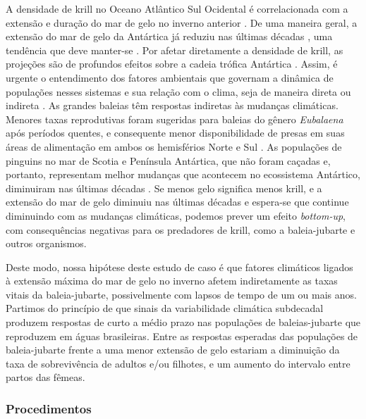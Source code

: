 \documentclass[12pt, A4]{article}
\begin{document}
A densidade de krill no Oceano Atlântico Sul Ocidental é
correlacionada com a extensão e duração do mar de gelo no inverno
anterior \citep{loeb1997,atkinson2004}. De uma maneira
geral, a extensão do mar de gelo da Antártica já reduziu nas últimas
décadas \citep{trivelpiece2011}, uma tendência que deve manter-se 
\citep{ipcc2007}. Por afetar diretamente a densidade de krill, as
projeções são de profundos efeitos sobre a cadeia trófica Antártica
\citep{nicol2008}. 
Assim, é urgente o entendimento dos fatores ambientais que governam a
dinâmica de populações nesses sistemas e sua relação com o clima, 
seja de maneira direta ou indireta
\citep{boggs2012}. 
As grandes baleias têm respostas indiretas às mudanças
climáticas. Menores taxas reprodutivas foram sugeridas para baleias do
gênero \emph{Eubalaena} após períodos quentes, e consequente
menor disponibilidade de presas em suas áreas de alimentação em ambos
os hemisférios Norte e Sul \citep{greene2004,leaper2006}. 
As populações de pinguins no mar de Scotia e Península
Antártica, que não foram caçadas e, portanto, representam melhor
mudanças que acontecem no ecossistema Antártico, diminuiram nas
últimas décadas \citep{trivelpiece2011}. Se menos gelo
significa menos krill, e a extensão do mar de gelo diminuiu nas
últimas décadas e espera-se que continue diminuindo com as mudanças
climáticas, podemos prever um efeito \emph{bottom-up}, com consequências
negativas para os predadores de krill, como a baleia-jubarte e outros
organismos.

Deste modo, nossa hipótese deste estudo de caso é que fatores
climáticos ligados à extensão máxima do mar de gelo no inverno afetem
indiretamente as taxas vitais da baleia-jubarte, possivelmente com
lapsos de tempo de um ou mais anos. Partimos do princípio de que
sinais da variabilidade climática subdecadal produzem respostas de
curto a médio prazo nas populações de baleias-jubarte que reproduzem
em águas brasileiras. Entre as respostas esperadas das populações de
baleia-jubarte frente a uma menor extensão de gelo estariam a
diminuição da taxa de sobrevivência de adultos e/ou filhotes, e um
aumento do intervalo entre partos das fêmeas.

\subsubsection*{Procedimentos}
\label{sec:procedimentos-1}
\end{document}
